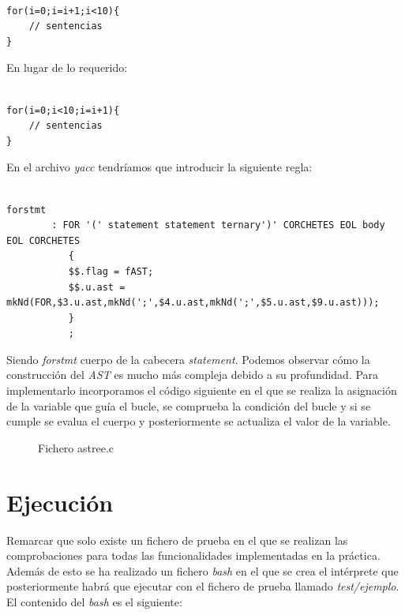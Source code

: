 \documentclass[11pt]{article}
\begin{document}
\begin{verbatim}

for(i=0;i=i+1;i<10){
    // sentencias
}
\end{verbatim}

\noindent En lugar de lo requerido:

\begin{verbatim}

for(i=0;i<10;i=i+1){
    // sentencias
}
\end{verbatim}

\noindent En el archivo \textit{yacc} tendríamos que introducir la siguiente regla:

\begin{verbatim}

forstmt
        : FOR '(' statement statement ternary')' CORCHETES EOL body EOL CORCHETES
           {
           $$.flag = fAST;
           $$.u.ast = mkNd(FOR,$3.u.ast,mkNd(';',$4.u.ast,mkNd(';',$5.u.ast,$9.u.ast)));
           }
           ;
\end{verbatim}

\noindent Siendo \textit{forstmt} cuerpo de la cabecera \textit{statement}. Podemos observar cómo la construcción del \textit{AST} es mucho más compleja debido a su profundidad. Para implementarlo incorporamos el código siguiente en el que se realiza la asignación de la variable que guía el bucle, se comprueba la condición del bucle y si se cumple se evalua el cuerpo y posteriormente se actualiza el valor de la variable.

\begin{figure}[H]
  \centering
  \caption{Fichero astree.c}
\end{figure}


\section{Ejecución}

\noindent Remarcar que solo existe un fichero de prueba en el que se realizan las comprobaciones para todas las funcionalidades implementadas en la práctica. Además de esto se ha realizado un fichero \textit{bash} en el que se crea el intérprete que posteriormente habrá que ejecutar con el fichero de prueba llamado \textit{test/ejemplo}. El contenido del \textit{bash} es el siguiente:
\end{document}
